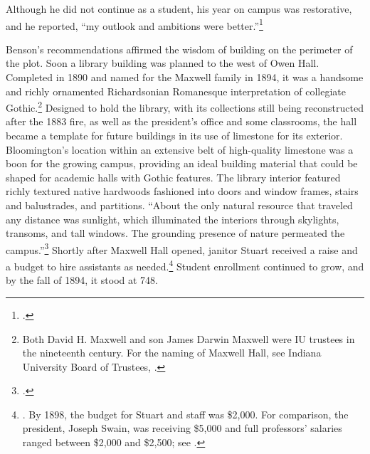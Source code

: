 \documentclass[
  american,
  letterpaper,
]{scrreprt}
\begin{document}
Although he did not continue as a student, his year on campus was
restorative, and he reported, ``my outlook and ambitions were
better.''\footnote{.}

Benson's recommendations affirmed the wisdom of building on the
perimeter of the plot. Soon a library building was planned to the west
of Owen Hall. Completed in 1890 and named for the Maxwell family in
1894, it was a handsome and richly ornamented Richardsonian Romanesque
interpretation of collegiate Gothic.\footnote{Both David H. Maxwell and
  son James Darwin Maxwell were IU trustees in the nineteenth century.
  For the naming of Maxwell Hall, see Indiana University Board of
  Trustees, .}
Designed to hold the library, with its collections still being
reconstructed after the 1883 fire, as well as the president's office and
some classrooms, the hall became a template for future buildings in its
use of limestone for its exterior. Bloomington's location within an
extensive belt of high-quality limestone was a boon for the growing
campus, providing an ideal building material that could be shaped for
academic halls with Gothic features. The library interior featured
richly textured native hardwoods fashioned into doors and window frames,
stairs and balustrades, and partitions. ``About the only natural
resource that traveled any distance was sunlight, which illuminated the
interiors through skylights, transoms, and tall windows. The grounding
presence of nature permeated the campus.''\footnote{.} Shortly after Maxwell Hall opened,
janitor Stuart received a raise and a budget to hire assistants as
needed.\footnote{.
  By 1898, the budget for Stuart and staff was \$2,000. For comparison,
  the president, Joseph Swain, was receiving \$5,000 and full
  professors' salaries ranged between \$2,000 and \$2,500; see
  .}
Student enrollment continued to grow, and by the fall of 1894, it stood
at 748.
\end{document}
